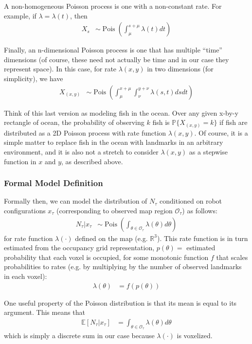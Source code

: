 \documentclass[12pt]{article}
\DeclareMathOperator{\Pois}{Pois}
\begin{document}
A non-homogeneous Poisson process is one with a non-constant rate. For example, if $\lambda = \lambda(t)$, then
\begin{align}
  X_s &\sim \Pois \left( \int_{\mu}^{s + \mu} \lambda(t) dt \right)
\end{align}

Finally, an n-dimensional Poisson process is one that has multiple ``time'' dimensions (of course, these need not actually be time and in our case they represent space). In this case, for rate $\lambda(x, y)$ in two dimensions (for simplicity), we have
\begin{align}
  X_{(x, y)} &\sim \Pois \left( \int_{\mu}^{x + \mu} \int_{\nu}^{y + \nu} \lambda(s, t) ds dt \right)
\end{align}

Think of this last version as modeling fish in the ocean. Over any given x-by-y rectangle of ocean, the probability of observing $k$ fish is $\mathbb{P}\{X_{(x, y)} = k\}$ if fish are distributed as a 2D Poisson process with rate function $\lambda(x, y)$. Of course, it is a simple matter to replace fish in the ocean with landmarks in an arbitrary environment, and it is also not a stretch to consider $\lambda(x, y)$ as a stepwise function in $x$ and $y$, as described above.

\subsubsection{Formal Model Definition}

Formally then, we can model the distribution of $N_{\tau}$ conditioned on robot configurations $x_{\tau}$ (corresponding to observed map region $\mathcal{O_{\tau}}$) as follows:
\begin{align}
  N_{\tau} | x_{\tau} &\sim
  \Pois \left( \int_{\theta \in \mathcal{O_{\tau}}} \lambda(\theta) d\theta \right)
\end{align}
for rate function $\lambda(\cdot)$ defined on the map (e.g. $\mathbb{R}^3$). This rate function is in turn estimated from the occupancy grid representation, $p(\theta) = $ estimated probability that each voxel is occupied, for some monotonic function $f$ that scales probabilities to rates (e.g. by multiplying by the number of observed landmarks in each voxel):
\begin{align}
  \lambda(\theta) &= f(p(\theta))
\end{align}

One useful property of the Poisson distribution is that its mean is equal to its argument. This means that
\begin{align}
  \mathbb{E}[N_{\tau} | x_{\tau}] &= \int_{\theta \in \mathcal{O_{\tau}}} \lambda(\theta) d\theta
\end{align}
which is simply a discrete sum in our case because $\lambda(\cdot)$ is voxelized.
\end{document}
